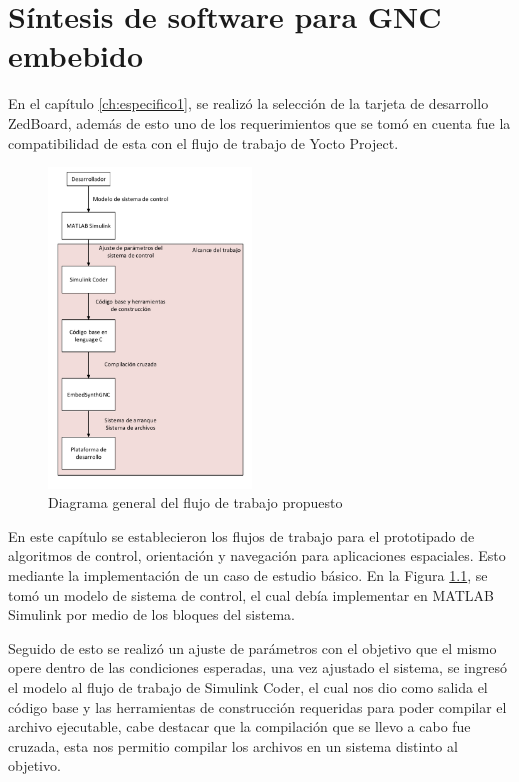 \chapter{Síntesis de software para GNC embebido}
\label{ch:especifico2}

En el capítulo \ref{ch:especifico1}, se realizó la selección de la tarjeta de desarrollo ZedBoard, además de esto uno de los requerimientos que se tomó en cuenta fue la compatibilidad de esta con el flujo de trabajo de Yocto Project.

\begin{figure}[h!]
    \centering
    \includegraphics[width=0.48\textwidth]{fig/especifico_2/Diagrama general del proyecto.pdf}
    \caption{Diagrama general del flujo de trabajo propuesto}
    \label{fig:diagrama_flujo_trabajo}
\end{figure}

En este capítulo se establecieron los flujos de trabajo para el prototipado de algoritmos de control, orientación y navegación para aplicaciones espaciales. Esto mediante la implementación de un caso de estudio básico. En la Figura \ref{fig:diagrama_flujo_trabajo}, se tomó un modelo de sistema de control, el cual debía implementar en MATLAB Simulink por medio de los bloques del sistema. 

Seguido de esto se realizó un ajuste de parámetros con el objetivo que el mismo opere dentro de las condiciones esperadas, una vez ajustado el sistema, se ingresó el modelo al flujo de trabajo de Simulink Coder, el cual nos dio como salida el código base y las herramientas de construcción requeridas para poder compilar el archivo ejecutable, cabe destacar que la compilación que se llevo a cabo fue cruzada, esta nos permitio compilar los archivos en un sistema distinto al objetivo. 

